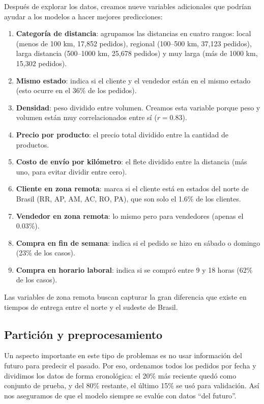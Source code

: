 \documentclass[journal]{IEEEtran}
\begin{document}
Después de explorar los datos, creamos nueve variables adicionales que podrían ayudar a los modelos a hacer mejores predicciones:
\begin{enumerate}
	\item \textbf{Categoría de distancia}: agrupamos las distancias en cuatro rangos: local (menos de 100 km, 17{,}852 pedidos), regional (100--500 km, 37{,}123 pedidos), larga distancia (500--1000 km, 25{,}678 pedidos) y muy larga (más de 1000 km, 15{,}302 pedidos).
	\item \textbf{Mismo estado}: indica si el cliente y el vendedor están en el mismo estado (esto ocurre en el 36\% de los pedidos).
	\item \textbf{Densidad}: peso dividido entre volumen. Creamos esta variable porque peso y volumen están muy correlacionados entre sí ($r=0.83$).
	\item \textbf{Precio por producto}: el precio total dividido entre la cantidad de productos.
	\item \textbf{Costo de envío por kilómetro}: el flete dividido entre la distancia (más uno, para evitar dividir entre cero).
	\item \textbf{Cliente en zona remota}: marca si el cliente está en estados del norte de Brasil (RR, AP, AM, AC, RO, PA), que son solo el 1.6\% de los clientes.
	\item \textbf{Vendedor en zona remota}: lo mismo pero para vendedores (apenas el 0.03\%).
	\item \textbf{Compra en fin de semana}: indica si el pedido se hizo en sábado o domingo (23\% de los casos).
	\item \textbf{Compra en horario laboral}: indica si se compró entre 9 y 18 horas (62\% de los casos).
\end{enumerate}
Las variables de zona remota buscan capturar la gran diferencia que existe en tiempos de entrega entre el norte y el sudeste de Brasil.

\subsection{Partición y preprocesamiento}

Un aspecto importante en este tipo de problemas es no usar información del futuro para predecir el pasado. Por eso, ordenamos todos los pedidos por fecha y dividimos los datos de forma cronológica: el 20\% más reciente quedó como conjunto de prueba, y del 80\% restante, el último 15\% se usó para validación. Así nos aseguramos de que el modelo siempre se evalúe con datos ``del futuro''.
\end{document}
